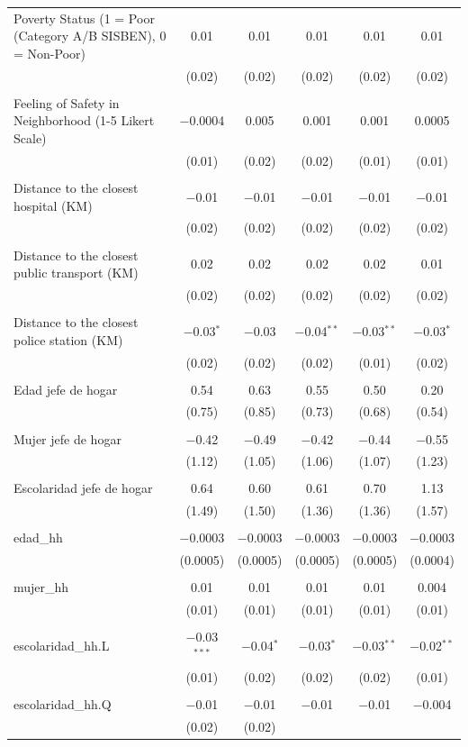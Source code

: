 \begin{table}[H]
\begin{tabularx}{0.9\textwidth}{@{\extracolsep{-7pt}}lccccc}
 Poverty Status (1 = Poor (Category A/B SISBEN), 0 = Non-Poor) & 0.01 & 0.01 & 0.01 & 0.01 & 0.01 \\    & (0.02) & (0.02) & (0.02) & (0.02) & (0.02) \\    & & & & & \\   Feeling of Safety in Neighborhood (1-5 Likert Scale) & $-$0.0004 & 0.005 & 0.001 & 0.001 & 0.0005 \\    & (0.01) & (0.02) & (0.02) & (0.01) & (0.01) \\    & & & & & \\   Distance to the closest hospital (KM) & $-$0.01 & $-$0.01 & $-$0.01 & $-$0.01 & $-$0.01 \\    & (0.02) & (0.02) & (0.02) & (0.02) & (0.02) \\    & & & & & \\   Distance to the closest public transport  (KM) & 0.02 & 0.02 & 0.02 & 0.02 & 0.01 \\    & (0.02) & (0.02) & (0.02) & (0.02) & (0.02) \\    & & & & & \\   Distance to the closest police station (KM) & $-$0.03$^{*}$ & $-$0.03 & $-$0.04$^{**}$ & $-$0.03$^{**}$ & $-$0.03$^{*}$ \\    & (0.02) & (0.02) & (0.02) & (0.01) & (0.02) \\    & & & & & \\   Edad jefe de hogar & 0.54 & 0.63 & 0.55 & 0.50 & 0.20 \\    & (0.75) & (0.85) & (0.73) & (0.68) & (0.54) \\    & & & & & \\   Mujer jefe de hogar & $-$0.42 & $-$0.49 & $-$0.42 & $-$0.44 & $-$0.55 \\    & (1.12) & (1.05) & (1.06) & (1.07) & (1.23) \\    & & & & & \\   Escolaridad jefe de hogar & 0.64 & 0.60 & 0.61 & 0.70 & 1.13 \\    & (1.49) & (1.50) & (1.36) & (1.36) & (1.57) \\    & & & & & \\   edad\_hh & $-$0.0003 & $-$0.0003 & $-$0.0003 & $-$0.0003 & $-$0.0003 \\    & (0.0005) & (0.0005) & (0.0005) & (0.0005) & (0.0004) \\    & & & & & \\   mujer\_hh & 0.01 & 0.01 & 0.01 & 0.01 & 0.004 \\    & (0.01) & (0.01) & (0.01) & (0.01) & (0.01) \\    & & & & & \\   escolaridad\_hh.L & $-$0.03$^{***}$ & $-$0.04$^{*}$ & $-$0.03$^{*}$ & $-$0.03$^{**}$ & $-$0.02$^{**}$ \\    & (0.01) & (0.02) & (0.02) & (0.02) & (0.01) \\    & & & & & \\   escolaridad\_hh.Q & $-$0.01 & $-$0.01 & $-$0.01 & $-$0.01 & $-$0.004 \\    & (0.02) & (0.02) 
\end{tabularx}
\end{table}
